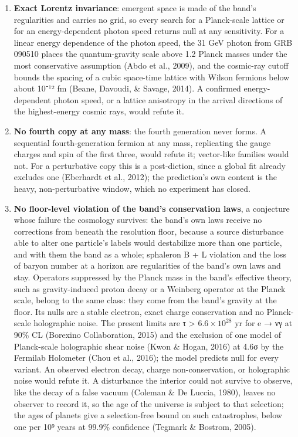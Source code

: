 \documentclass[
]{article}
\begin{document}
\begin{enumerate}
\def\labelenumi{(\alph{enumi})}
\setcounter{enumi}{4}
\item
  \textbf{Exact Lorentz invariance}: emergent space is made of the
  band's regularities and carries no grid, so every search for a
  Planck-scale lattice or for an energy-dependent photon speed returns
  null at any sensitivity. For a linear energy dependence of the photon
  speed, the 31 GeV photon from GRB 090510 places the quantum-gravity
  scale above 1.2 Planck masses under the most conservative assumption
  (Abdo et al., 2009), and the cosmic-ray cutoff bounds the spacing of a
  cubic space-time lattice with Wilson fermions below about 10⁻¹² fm
  (Beane, Davoudi, \& Savage, 2014). A confirmed energy-dependent photon
  speed, or a lattice anisotropy in the arrival directions of the
  highest-energy cosmic rays, would refute it.
\item
  \textbf{No fourth copy at any mass}: the fourth generation never
  forms. A sequential fourth-generation fermion at any mass, replicating
  the gauge charges and spin of the first three, would refute it;
  vector-like families would not. For a perturbative copy this is a
  post-diction, since a global fit already excludes one (Eberhardt et
  al., 2012); the prediction's own content is the heavy,
  non-perturbative window, which no experiment has closed.
\item
  \textbf{No floor-level violation of the band's conservation laws}, a
  conjecture whose failure the cosmology survives: the band's own laws
  receive no corrections from beneath the resolution floor, because a
  source disturbance able to alter one particle's labels would
  destabilize more than one particle, and with them the band as a whole;
  sphaleron B + L violation and the loss of baryon number at a horizon
  are regularities of the band's own laws and stay. Operators suppressed
  by the Planck mass in the band's effective theory, such as
  gravity-induced proton decay or a Weinberg operator at the Planck
  scale, belong to the same class: they come from the band's gravity at
  the floor. Its nulls are a stable electron, exact charge conservation
  and no Planck-scale holographic noise. The present limits are τ
  \textgreater{} \(6.6 \times 10^{28}\) yr for e → νγ at 90\% CL
  (Borexino Collaboration, 2015) and the exclusion of one model of
  Planck-scale holographic shear noise (Kwon \& Hogan, 2016) at 4.6σ by
  the Fermilab Holometer (Chou et al., 2016); the model predicts null
  for every variant. An observed electron decay, charge
  non-conservation, or holographic noise would refute it. A disturbance
  the interior could not survive to observe, like the decay of a false
  vacuum (Coleman \& De Luccia, 1980), leaves no observer to record it,
  so the age of the universe is subject to that selection; the ages of
  planets give a selection-free bound on such catastrophes, below one
  per 10⁹ years at 99.9\% confidence (Tegmark \& Bostrom, 2005).
\end{enumerate}
\end{document}
